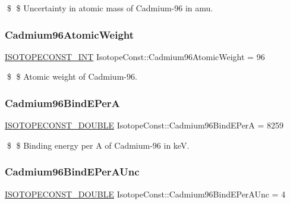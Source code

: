 \$ \$ Uncertainty in atomic mass of Cadmium-\/96 in amu. \mbox{\label{group___isotope_const-_cadmium-_cd96_gaa31f8c4c28974a240d0962e1073513c1}} 
\subsubsection{\texorpdfstring{Cadmium96\+Atomic\+Weight}{Cadmium96AtomicWeight}}
{\footnotesize\ttfamily \mbox{\hyperlink{group___isotope_const-_macros_ga5f18360b3e99483a35c32d789e62621c}{I\+S\+O\+T\+O\+P\+E\+C\+O\+N\+S\+T\+\_\+\+I\+NT}} Isotope\+Const\+::\+Cadmium96\+Atomic\+Weight = 96}

\$ \$ Atomic weight of Cadmium-\/96. \mbox{\label{group___isotope_const-_cadmium-_cd96_ga2c9bed1fa411c94c3ba2bdfa577999f5}} 
\subsubsection{\texorpdfstring{Cadmium96\+Bind\+E\+PerA}{Cadmium96BindEPerA}}
{\footnotesize\ttfamily \mbox{\hyperlink{group___isotope_const-_macros_ga8f45a7272ce02c0b4c65c44636ed719a}{I\+S\+O\+T\+O\+P\+E\+C\+O\+N\+S\+T\+\_\+\+D\+O\+U\+B\+LE}} Isotope\+Const\+::\+Cadmium96\+Bind\+E\+PerA = 8259}

\$ \$ Binding energy per A of Cadmium-\/96 in keV. \mbox{\label{group___isotope_const-_cadmium-_cd96_gaff9b18541ce60b33bf183de41e072977}} 
\subsubsection{\texorpdfstring{Cadmium96\+Bind\+E\+Per\+A\+Unc}{Cadmium96BindEPerAUnc}}
{\footnotesize\ttfamily \mbox{\hyperlink{group___isotope_const-_macros_ga8f45a7272ce02c0b4c65c44636ed719a}{I\+S\+O\+T\+O\+P\+E\+C\+O\+N\+S\+T\+\_\+\+D\+O\+U\+B\+LE}} Isotope\+Const\+::\+Cadmium96\+Bind\+E\+Per\+A\+Unc = 4}


